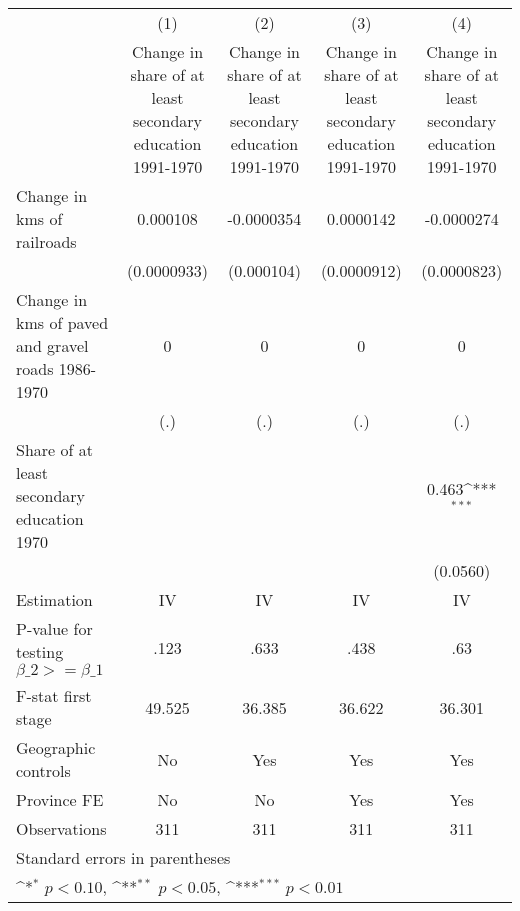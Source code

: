 {
\def\sym#1{\ifmmode^{#1}\else\(^{#1}\)\fi}
\begin{tabular}{l*{4}{c}}
\hline\hline
                &\multicolumn{1}{c}{(1)}&\multicolumn{1}{c}{(2)}&\multicolumn{1}{c}{(3)}&\multicolumn{1}{c}{(4)}\\
                &\multicolumn{1}{c}{Change in share of at least secondary education 1991-1970}&\multicolumn{1}{c}{Change in share of at least secondary education 1991-1970}&\multicolumn{1}{c}{Change in share of at least secondary education 1991-1970}&\multicolumn{1}{c}{Change in share of at least secondary education 1991-1970}\\
\hline
Change in kms of railroads& 0.000108         &-0.0000354         &0.0000142         &-0.0000274         \\
                &(0.0000933)         &(0.000104)         &(0.0000912)         &(0.0000823)         \\
[1em]
Change in kms of paved and gravel roads 1986-1970&        0         &        0         &        0         &        0         \\
                &      (.)         &      (.)         &      (.)         &      (.)         \\
[1em]
Share of at least secondary education 1970&                  &                  &                  &    0.463\sym{***}\\
                &                  &                  &                  & (0.0560)         \\
\hline
Estimation      &       IV         &       IV         &       IV         &       IV         \\
P-value for testing $\beta\_2 >= \beta\_1$&     .123         &     .633         &     .438         &      .63         \\
F-stat first stage&   49.525         &   36.385         &   36.622         &   36.301         \\
Geographic controls&       No         &      Yes         &      Yes         &      Yes         \\
Province FE     &       No         &       No         &      Yes         &      Yes         \\
Observations    &      311         &      311         &      311         &      311         \\
\hline\hline
\multicolumn{5}{l}{\footnotesize Standard errors in parentheses}\\
\multicolumn{5}{l}{\footnotesize \sym{*} \(p<0.10\), \sym{**} \(p<0.05\), \sym{***} \(p<0.01\)}\\
\end{tabular}
}
